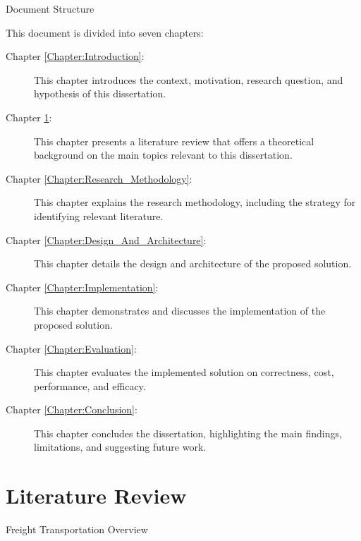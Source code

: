 \documentclass[12pt, reqno, oneside]{amsbook}
\makeatletter
\def\section{\@startsection{section}{1}%
      \z@{.5\linespacing\@plus.7\linespacing}{.25\linespacing}%
      {\normalfont\bfseries\flushleft}}
\theoremstyle{definition}
\theoremstyle{definition}
\numberwithin{section}{chapter}
\numberwithin{table}{chapter}
\numberwithin{figure}{chapter}
\makeatother
\begin{document}
\section{Document Structure}
\label{Section:Document_Structure}

This document is divided into seven chapters:

\begin{description}
  \item [Chapter \ref{Chapter:Introduction}: ] This chapter introduces the context, motivation, research question, and hypothesis of this dissertation.
  \item [Chapter \ref{Chapter:Literature_Review}: ] This chapter presents a literature review that offers a theoretical background on the main topics relevant to this dissertation.
  \item [Chapter \ref{Chapter:Research_Methodology}: ] This chapter explains the research methodology, including the strategy for identifying relevant literature.
  \item [Chapter \ref{Chapter:Design_And_Architecture}: ] This chapter details the design and architecture of the proposed solution.
  \item [Chapter \ref{Chapter:Implementation}: ] This chapter demonstrates and discusses the implementation of the proposed solution.
  \item [Chapter \ref{Chapter:Evaluation}: ] This chapter evaluates the implemented solution on correctness, cost, performance, and efficacy.
  \item [Chapter \ref{Chapter:Conclusion}: ] This chapter concludes the dissertation, highlighting the main findings, limitations, and suggesting future work.
\end{description}

\chapter{Literature Review}
\label{Chapter:Literature_Review}

\section{Freight Transportation Overview}
\label{Section:Freight_Transportation_Overview}
\end{document}
